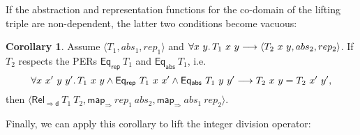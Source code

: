 \documentclass{article}
\theoremstyle{definition}
\newtheorem{corollary}[definition]{Corollary}
\newcommand{\eqrep}{\mathsf{Eq_{rep}}}
\newcommand{\eqabs}{\mathsf{Eq_{abs}}}
\newcommand{\mapfun}{\mathsf{map_\Rightarrow}}
\newcommand{\relfund}{\mathsf{Rel_{\Rightarrow d}}}
\begin{document}
If the abstraction and representation functions for the co-domain of the lifting triple are non-dependent,
the latter two conditions become vacuous:
\begin{corollary}\label{cor:lift-trip-dep-fun}
Assume \(\langle T_1, abs_1, rep_1 \rangle\) and \(\forall x\ y \ldotp T_1\ x\ y \longrightarrow \langle T_2\ x\ y, abs_2, rep_2\rangle\).
If \(T_2\) respects the PERs \(\eqrep\ T_1\) and \(\eqabs\ T_1\), i.e.
\begin{equation*}
\forall x\ x'\ y\ y' \ldotp T_1\ x\ y \land \eqrep\ T_1\ x\ x' \land \eqabs\ T_1\ y\ y' \longrightarrow T_2\ x\ y = T_2\ x'\ y',
\end{equation*}
then \(\langle \relfund\ T_1\ T_2, \mapfun\ rep_1\ abs_2, \mapfun\ abs_1\ rep_2 \rangle\).
\end{corollary}
Finally, we can apply this corollary to lift the integer division operator:
\end{document}
